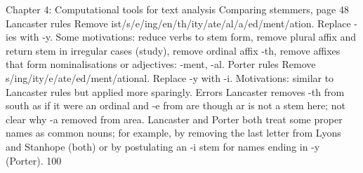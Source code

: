 
Chapter 4: Computational tools for text analysis
Comparing stemmers, page 48
Lancaster rules Remove ist/s/e/ing/en/th/ity/ate/al/a/ed/ment/ation.
Replace -ies with -y.
Some motivations: reduce verbs to stem form, remove plural affix and
return stem in irregular cases (study), remove ordinal affix -th, remove
affixes that form nominalisations or adjectives: -ment, -al.
Porter rules Remove s/ing/ity/e/ate/ed/ment/ational.
Replace -y with -i.
Motivations: similar to Lancaster rules but applied more sparingly.
Errors Lancaster removes -th from south as if it were an ordinal and -e from are
though ar is not a stem here; not clear why -a removed from area. Lancaster and
Porter both treat some proper names as common nouns; for example, by
removing the last letter from Lyons and Stanhope (both) or by postulating an -i
stem for names ending in -y (Porter).
100
